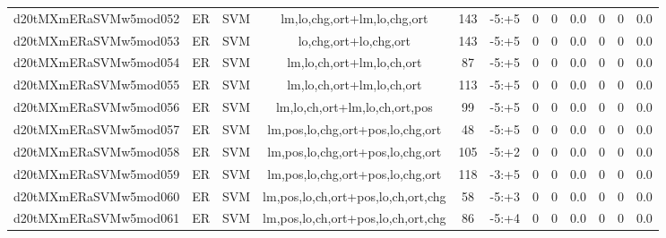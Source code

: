 \documentclass[a4paper]{article}
\begin{document}
\begin{landscape}
\begin{center}
\begin{tabular}{ |c|c|c|c|c|c|c|c|c|c|c|c|}
 
 	
 	\small{ d20tMXmERaSVMw5mod052 } & ER & SVM & lm,lo,chg,ort+lm,lo,chg,ort  &  143 &  -5:+5  &  0 & 0 & 0.0  &  0 & 0 & 0.0 \\
 	

 
 	
 	\small{ d20tMXmERaSVMw5mod053 } & ER & SVM & lo,chg,ort+lo,chg,ort  &  143 &  -5:+5  &  0 & 0 & 0.0  &  0 & 0 & 0.0 \\
 	

 
 	
 	\small{ d20tMXmERaSVMw5mod054 } & ER & SVM & lm,lo,ch,ort+lm,lo,ch,ort  &  87 &  -5:+5  &  0 & 0 & 0.0  &  0 & 0 & 0.0 \\
 	

 
 	
 	\small{ d20tMXmERaSVMw5mod055 } & ER & SVM & lm,lo,ch,ort+lm,lo,ch,ort  &  113 &  -5:+5  &  0 & 0 & 0.0  &  0 & 0 & 0.0 \\
 	

 
 	
 	\small{ d20tMXmERaSVMw5mod056 } & ER & SVM & lm,lo,ch,ort+lm,lo,ch,ort,pos  &  99 &  -5:+5  &  0 & 0 & 0.0  &  0 & 0 & 0.0 \\
 	

 
 	
 	\small{ d20tMXmERaSVMw5mod057 } & ER & SVM & lm,pos,lo,chg,ort+pos,lo,chg,ort  &  48 &  -5:+5  &  0 & 0 & 0.0  &  0 & 0 & 0.0 \\
 	

 
 	
 	\small{ d20tMXmERaSVMw5mod058 } & ER & SVM & lm,pos,lo,chg,ort+pos,lo,chg,ort  &  105 &  -5:+2  &  0 & 0 & 0.0  &  0 & 0 & 0.0 \\
 	

 
 	
 	\small{ d20tMXmERaSVMw5mod059 } & ER & SVM & lm,pos,lo,chg,ort+pos,lo,chg,ort  &  118 &  -3:+5  &  0 & 0 & 0.0  &  0 & 0 & 0.0 \\
 	

 
 	
 	\small{ d20tMXmERaSVMw5mod060 } & ER & SVM & lm,pos,lo,ch,ort+pos,lo,ch,ort,chg  &  58 &  -5:+3  &  0 & 0 & 0.0  &  0 & 0 & 0.0 \\
 	

 
 	
 	\small{ d20tMXmERaSVMw5mod061 } & ER & SVM & lm,pos,lo,ch,ort+pos,lo,ch,ort,chg  &  86 &  -5:+4  &  0 & 0 & 0.0  &  0 & 0 & 0.0 \\
 	
 \hline
\end{tabular}
\end{center}





\end{landscape}
\end{document}
